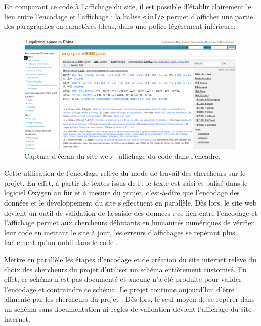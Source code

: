 En comparant ce code \XML à l'affichage du site, il est possible d'établir clairement le lien entre l'encodage et l'affichage : la balise \texttt{<inf/>} permet d'afficher une partie des paragraphes en caractères bleus, dans une police légèrement inférieure. 
\begin{figure}[h]
    \centering
    \includegraphics[width=\textwidth]{images/image1.png}
    \caption{Capture d'écran du site web \LSC - affichage du code \XML dans l'encadré.}
\end{figure}

Cette utilisation de l'encodage relève du mode de travail des chercheurs sur le projet. En effet, à partir de textes issus de l'\OCR, le texte est saisi et balisé dans le logiciel Oxygen au fur et à mesure du projet, c'est-à-dire que l'encodage des données et le développement du site s'effectuent en parallèle. Dès lors, le site web devient un outil de validation de la saisie des données : ce lien entre l'encodage et l'affichage permet aux chercheurs débutants en humanités numériques de vérifier leur code en mettant le site à jour, les erreurs d'affichages se repérant plus facilement qu'un oubli dans le code \XML. 

Mettre en parallèle les étapes d'encodage et de création du site internet relève du choix des chercheurs du projet d'utiliser un schéma \XML entièrement customisé. En effet, ce schéma n'est pas documenté et aucune \DTD n'a été produite pour valider l'encodage et contraindre ce schéma. Le projet \LSC continue aujourd'hui d'être alimenté par les chercheurs du projet \COREL. Dès lors, le seul moyen de se repérer dans un schéma sans documentation ni règles de validation devient l'affichage du site internet.

